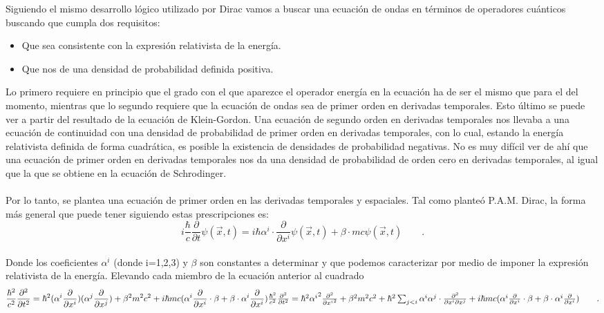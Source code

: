 \documentclass[11pt,letterpaper]{article}     %
\begin{document}
Siguiendo el mismo desarrollo lógico utilizado por Dirac vamos a buscar una ecuación de ondas en términos de operadores cuánticos buscando que cumpla dos requisitos: 
\begin{itemize}
\item Que sea consistente con la expresión relativista de la energía.
\item Que nos de una densidad de probabilidad definida positiva. 
\end{itemize}
Lo primero requiere en principio que el grado con el que aparezce el operador energía en la ecuación ha de ser el mismo que para el del momento, mientras que lo segundo requiere que la ecuación de ondas sea de primer orden en derivadas temporales. Esto último se puede ver a partir del resultado de la ecuación de Klein-Gordon. Una ecuación de segundo orden en derivadas temporales nos llevaba a una ecuación de continuidad con una densidad de probabilidad de primer orden en derivadas temporales, con lo cual, estando la energía relativista definida de forma cuadrática, es posible la existencia de densidades de probabilidad negativas. No es muy difícil ver de ahí que una ecuación de primer orden en derivadas temporales nos da una densidad de probabilidad de orden cero en derivadas temporales, al igual que la que se obtiene en la ecuación de Schrodinger.\\
\\Por lo tanto, se plantea una ecuación de primer orden en las derivadas temporales y espaciales. Tal como planteó P.A.M. Dirac, la forma más general que puede tener siguiendo estas prescripciones es:
\begin{equation} \label{eq:21}
i \frac{\hbar}{c}\frac{\partial}{\partial t} \psi (\vec{x},t) = i \hbar \alpha^i\cdot \frac{\partial}{\partial x^i} \psi(\vec{x},t) + \beta\cdot mc \psi(\vec{x},t) \qquad .
\end{equation}
\\Donde los coeficientes $\alpha^i$ (donde i=1,2,3) y $\beta$ son constantes a determinar y que podemos caracterizar por medio de imponer la expresión relativista de la energía. Elevando cada miembro de la ecuación anterior al cuadrado
\begin{equation} \label{eq:22}
\frac{\hbar^2}{c^2} \frac{\partial^2}{\partial t^2} = \hbar^2(\alpha^i \frac{\partial}{\partial x^i})(\alpha^j \frac{\partial}{\partial x^j}) +  \beta^2 m^2c^2 + i\hbar mc(\alpha^i  \frac{\partial}{\partial x^i} \cdot \beta + \beta \cdot \alpha^i \frac{\partial}{\partial x^i}) $$\\$$
\frac{\hbar^2}{c^2} \frac{\partial^2}{\partial t^2} = \hbar^2{\alpha^i}^2 \frac{\partial^2}{\partial {x^i}^2} + \beta^2 m^2 c^2 + \hbar^2\sum_{j<i} \alpha^i \alpha^j \cdot \frac{\partial^2}{\partial x^i \partial x^j} + i\hbar mc(\alpha^i \frac{\partial}{\partial x^i} \cdot \beta + \beta \cdot \alpha^i \frac{\partial}{\partial x^i}) \qquad .
\end{equation}
\end{document}

